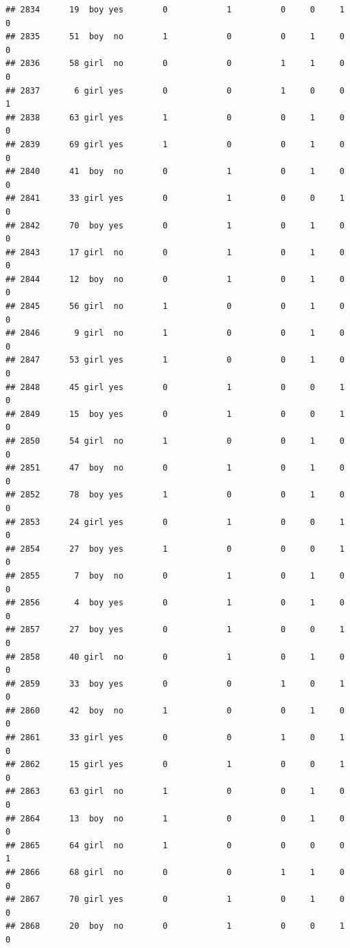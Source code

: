 \documentclass[man]{apa6}
\begin{document}
\begin{verbatim}
## 2834      19  boy yes        0            1          0     0     1     0
## 2835      51  boy  no        1            0          0     1     0     0
## 2836      58 girl  no        0            0          1     1     0     0
## 2837       6 girl yes        0            0          1     0     0     1
## 2838      63 girl yes        1            0          0     1     0     0
## 2839      69 girl yes        1            0          0     1     0     0
## 2840      41  boy  no        0            1          0     1     0     0
## 2841      33 girl yes        0            1          0     0     1     0
## 2842      70  boy yes        0            1          0     1     0     0
## 2843      17 girl  no        0            1          0     1     0     0
## 2844      12  boy  no        0            1          0     1     0     0
## 2845      56 girl  no        1            0          0     1     0     0
## 2846       9 girl  no        1            0          0     1     0     0
## 2847      53 girl yes        1            0          0     1     0     0
## 2848      45 girl yes        0            1          0     0     1     0
## 2849      15  boy yes        0            1          0     0     1     0
## 2850      54 girl  no        1            0          0     1     0     0
## 2851      47  boy  no        0            1          0     1     0     0
## 2852      78  boy yes        1            0          0     1     0     0
## 2853      24 girl yes        0            1          0     0     1     0
## 2854      27  boy yes        1            0          0     0     1     0
## 2855       7  boy  no        0            1          0     1     0     0
## 2856       4  boy yes        0            1          0     1     0     0
## 2857      27  boy yes        0            1          0     0     1     0
## 2858      40 girl  no        0            1          0     1     0     0
## 2859      33  boy yes        0            0          1     0     1     0
## 2860      42  boy  no        1            0          0     1     0     0
## 2861      33 girl yes        0            0          1     0     1     0
## 2862      15 girl yes        0            1          0     0     1     0
## 2863      63 girl  no        1            0          0     1     0     0
## 2864      13  boy  no        1            0          0     1     0     0
## 2865      64 girl  no        1            0          0     0     0     1
## 2866      68 girl  no        0            0          1     1     0     0
## 2867      70 girl yes        0            1          0     1     0     0
## 2868      20  boy  no        0            1          0     0     1     0

\end{verbatim}
\end{document}
